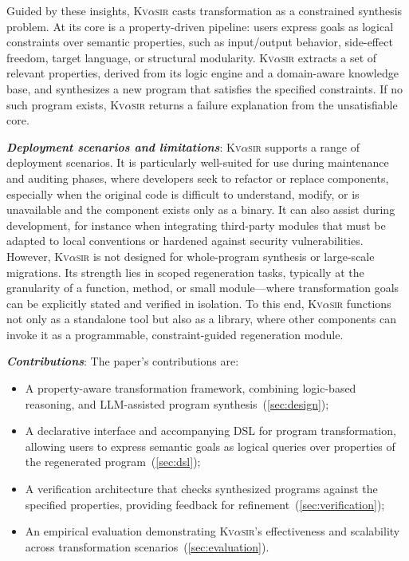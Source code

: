 \documentclass[nonacm,sigplan,review]{acmart}
\newcommand{\sys}{{\scshape Kv{$\alpha$}sir}\xspace}
\newcommand{\heading}[1]{\vspace{2pt}\noindent\textbf{\emph{#1}}:\enspace}
\begin{document}
Guided by these insights, \sys casts transformation as a constrained synthesis problem.
At its core is a property-driven pipeline: users express goals as logical constraints over semantic properties, such as input/output behavior, side-effect freedom, target language, or structural modularity.
\sys extracts a set of relevant properties, derived from its logic engine and a domain-aware knowledge base, and synthesizes a new program that satisfies the specified constraints.
If no such program exists, \sys returns a failure explanation from the unsatisfiable core.

\heading{Deployment scenarios and limitations}
\sys supports a range of deployment scenarios.
It is particularly well-suited for use during maintenance and auditing phases, where developers seek to refactor or replace components, especially when the original code is difficult to understand, modify, or is unavailable and the component exists only as a binary.
It can also assist during development, for instance when integrating third-party modules that must be adapted to local conventions or hardened against security vulnerabilities.
However, \sys is not designed for whole-program synthesis or large-scale migrations.
Its strength lies in scoped regeneration tasks, typically at the granularity of a function, method, or small module---where transformation goals can be explicitly stated and verified in isolation.
To this end, \sys functions not only as a standalone tool but also as a
library, where other components can invoke it as a programmable,
constraint-guided regeneration module.


\heading{Contributions}
The paper's contributions are:
\begin{itemize}
  \item A property-aware transformation framework, combining logic-based reasoning, and LLM-assisted program synthesis~(\cref{sec:design});
 \item A declarative interface and accompanying DSL for program transformation, allowing users to express semantic goals as logical queries over properties of the regenerated program~(\cref{sec:dsl});
 \item A verification architecture that checks synthesized programs against the specified properties, providing feedback for refinement~(\cref{sec:verification});
 \item An empirical evaluation demonstrating \sys's effectiveness and scalability across transformation scenarios~(\cref{sec:evaluation}).
\end{itemize}
\end{document}

